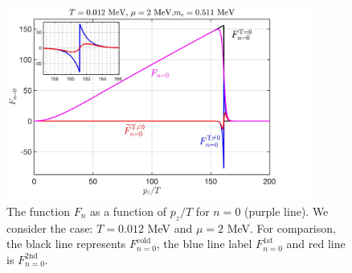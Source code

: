 \documentclass[sn-mathphys,Numbered]{sn-jnl}
\theoremstyle{thmstyleone}%
\theoremstyle{thmstyletwo}%
\theoremstyle{thmstylethree}%
\begin{document}
\begin{figure}[h]
\begin{center}
\includegraphics[width=0.9\textwidth]{./plot/NewFermi_Background}
\caption{The function $F_n$ as a function of $p_z/T$ for $n=0$ (purple line). We consider the case: $T=0.012$ MeV and $\mu=2$ MeV. For comparison, the black line represents $F_{n=0}^{\mathrm{cold}}$, the blue line label $F_{n=0}^{\mathrm{1st}}$ and red line is $F_{n=0}^{\mathrm{2nd}}$.}
\label{F0_Checking}
\end{center}
\end{figure}
\end{document}
